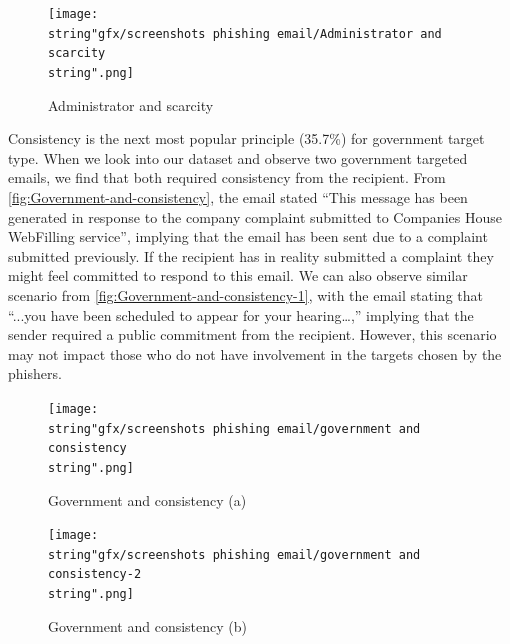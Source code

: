 \begin{figure}[H]
\centering{}\texttt{[image: \\string"gfx/screenshots phishing email/Administrator and scarcity\\string".png]}\protect\caption{\label{fig:Administrator-and-scarcity}Administrator and scarcity}
\end{figure}


Consistency is the next most popular principle (35.7\%) for government
target type. When we look into our dataset and observe two government
targeted emails, we find that both required consistency from the recipient.
From \autoref{fig:Government-and-consistency}, the email stated \textquotedblleft This
message has been generated in response to the company complaint submitted
to Companies House WebFilling service\textquotedblright , implying
that the email has been sent due to a complaint submitted previously.
If the recipient has in reality submitted a complaint they might feel
committed to respond to this email. We can also observe similar scenario
from \autoref{fig:Government-and-consistency-1}, with the email stating
that \textquotedblleft ...you have been scheduled to appear for your
hearing\dots ,\textquotedblright{} implying that the sender required
a public commitment from the recipient. However, this scenario may
not impact those who do not have involvement in the targets chosen
by the phishers.

\begin{figure}[H]
\texttt{[image: \\string"gfx/screenshots phishing email/government and consistency\\string".png]}\protect\caption{\label{fig:Government-and-consistency}Government and consistency
(a)}


%
%
\end{figure}


\begin{figure}[H]
\begin{centering}
\texttt{[image: \\string"gfx/screenshots phishing email/government and consistency-2\\string".png]}\protect\caption{\label{fig:Government-and-consistency-1}Government and consistency
(b)}

\par\end{centering}

%
%
\end{figure}


